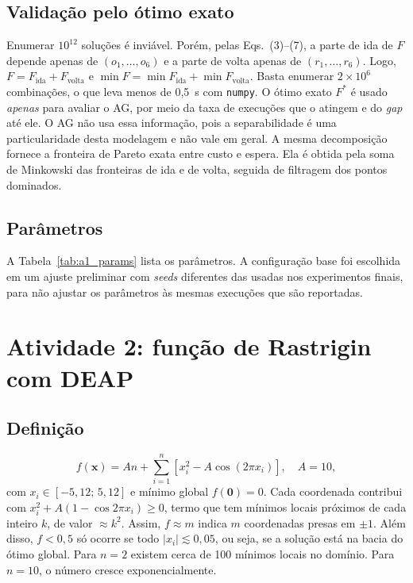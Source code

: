 \documentclass[conference]{IEEEtran}
\newcommand{\code}[1]{\texttt{#1}}
\begin{document}
\subsection{Validação pelo ótimo exato}
Enumerar $10^{12}$ soluções é inviável. Porém, pelas Eqs.~(3)--(7), a parte de ida de $F$ depende apenas de $(o_1,\dots,o_6)$ e a parte de volta apenas de $(r_1,\dots,r_6)$. Logo, $F=F_{\text{ida}}+F_{\text{volta}}$ e $\min F=\min F_{\text{ida}}+\min F_{\text{volta}}$. Basta enumerar $2\times10^6$ combinações, o que leva menos de 0,5~s com \code{numpy}. O ótimo exato $F^*$ é usado \emph{apenas} para avaliar o AG, por meio da taxa de execuções que o atingem e do \emph{gap} até ele. O AG não usa essa informação, pois a separabilidade é uma particularidade desta modelagem e não vale em geral. A mesma decomposição fornece a fronteira de Pareto exata entre custo e espera. Ela é obtida pela soma de Minkowski das fronteiras de ida e de volta, seguida de filtragem dos pontos dominados.

\subsection{Parâmetros}
A Tabela~\ref{tab:a1_params} lista os parâmetros. A configuração base foi escolhida em um ajuste preliminar com \emph{seeds} diferentes das usadas nos experimentos finais, para não ajustar os parâmetros às mesmas execuções que são reportadas.



\section{Atividade 2: função de Rastrigin com DEAP}
\label{sec:a2}
\subsection{Definição}
\begin{equation}
f(\mathbf{x})=An+\sum_{i=1}^{n}\left[x_i^2-A\cos(2\pi x_i)\right],\quad A=10,
\end{equation}
com $x_i\in[-5{,}12;\,5{,}12]$ e mínimo global $f(\mathbf{0})=0$. Cada coordenada contribui com $x_i^2+A(1-\cos 2\pi x_i)\ge0$, termo que tem mínimos locais próximos de cada inteiro $k$, de valor $\approx k^2$. Assim, $f\approx m$ indica $m$ coordenadas presas em $\pm1$. Além disso, $f<0{,}5$ só ocorre se todo $|x_i|\lesssim0{,}05$, ou seja, se a solução está na bacia do ótimo global. Para $n=2$ existem cerca de 100 mínimos locais no domínio. Para $n=10$, o número cresce exponencialmente.
\end{document}
